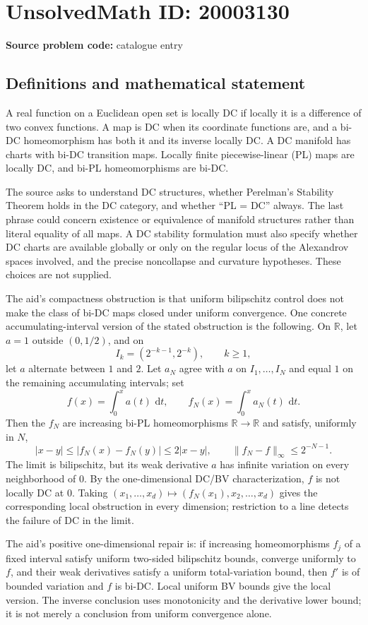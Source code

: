 \documentclass[11pt]{article}
\newcommand{\R}{\mathbb{R}}
\newcommand{\dd}{\,\mathrm{d}}
\begin{document}
\section*{UnsolvedMath ID: 20003130}
\textbf{Source problem code:} catalogue entry
\subsection{Definitions and mathematical statement}
A real function on a Euclidean open set is locally DC if locally it is a difference of two convex functions. A map is DC when its coordinate functions are, and a bi-DC homeomorphism has both it and its inverse locally DC. A DC manifold has charts with bi-DC transition maps. Locally finite piecewise-linear (PL) maps are locally DC, and bi-PL homeomorphisms are bi-DC.

The source asks to understand DC structures, whether Perelman's Stability Theorem holds in the DC category, and whether ``PL = DC'' always. The last phrase could concern existence or equivalence of manifold structures rather than literal equality of all maps. A DC stability formulation must also specify whether DC charts are available globally or only on the regular locus of the Alexandrov spaces involved, and the precise noncollapse and curvature hypotheses. These choices are not supplied.

The aid's compactness obstruction is that uniform bilipschitz control does not make the class of bi-DC maps closed under uniform convergence. One concrete accumulating-interval version of the stated obstruction is the following. On $\R$, let $a=1$ outside $(0,1/2)$, and on
\[
I_k=(2^{-k-1},2^{-k}),\qquad k\geq1,
\]
let $a$ alternate between $1$ and $2$. Let $a_N$ agree with $a$ on $I_1,\ldots,I_N$ and equal $1$ on the remaining accumulating intervals; set
\[
f(x)=\int_0^x a(t)\,\dd t,\qquad f_N(x)=\int_0^x a_N(t)\,\dd t.
\]
Then the $f_N$ are increasing bi-PL homeomorphisms $\R\to\R$ and satisfy, uniformly in $N$,
\[
|x-y|\leq|f_N(x)-f_N(y)|\leq2|x-y|,\qquad
\|f_N-f\|_\infty\leq2^{-N-1}.
\]
The limit is bilipschitz, but its weak derivative $a$ has infinite variation on every neighborhood of $0$. By the one-dimensional DC/BV characterization, $f$ is not locally DC at $0$. Taking $(x_1,\ldots,x_d)\mapsto(f_N(x_1),x_2,\ldots,x_d)$ gives the corresponding local obstruction in every dimension; restriction to a line detects the failure of DC in the limit.

The aid's positive one-dimensional repair is: if increasing homeomorphisms $f_j$ of a fixed interval satisfy uniform two-sided bilipschitz bounds, converge uniformly to $f$, and their weak derivatives satisfy a uniform total-variation bound, then $f'$ is of bounded variation and $f$ is bi-DC. Local uniform BV bounds give the local version. The inverse conclusion uses monotonicity and the derivative lower bound; it is not merely a conclusion from uniform convergence alone.
\end{document}
